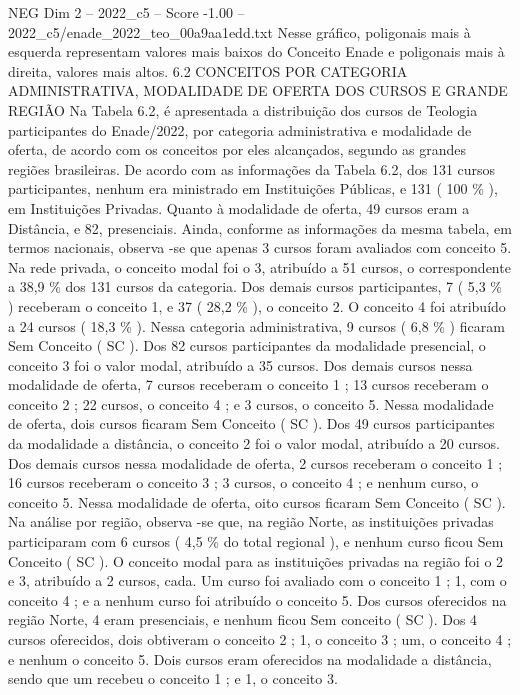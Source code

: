 \begin{textsample}{NEG Dim 2 – 2022\_c5 – Score -1.00 – 2022\_c5/enade\_2022\_teo\_00a9aa1edd.txt}
Nesse gráfico, poligonais mais à esquerda representam valores mais baixos do Conceito Enade e poligonais mais à direita, valores mais altos. 6.2 CONCEITOS POR CATEGORIA ADMINISTRATIVA, MODALIDADE DE OFERTA DOS CURSOS E GRANDE REGIÃO Na Tabela 6.2, é apresentada a distribuição dos cursos de Teologia participantes do Enade/2022, por categoria administrativa e modalidade de oferta, de acordo com os conceitos por eles alcançados, segundo as grandes regiões brasileiras.
De acordo com as informações da Tabela 6.2, dos 131 cursos participantes, nenhum era ministrado em Instituições Públicas, e 131 ( 100 \% ), em Instituições Privadas.
Quanto à modalidade de oferta, 49 cursos eram a Distância, e 82, presenciais.
Ainda, conforme as informações da mesma tabela, em termos nacionais, observa -se que apenas 3 cursos foram avaliados com conceito 5.
Na rede privada, o conceito modal foi o 3, atribuído a 51 cursos, o correspondente a 38,9 \% dos 131 cursos da categoria.
Dos demais cursos participantes, 7 ( 5,3 \% ) receberam o conceito 1, e 37 ( 28,2 \% ), o conceito 2.
O conceito 4 foi atribuído a 24 cursos ( 18,3 \% ).
Nessa categoria administrativa, 9 cursos ( 6,8 \% ) ficaram Sem Conceito ( SC ).
Dos 82 cursos participantes da modalidade presencial, o conceito 3 foi o valor modal, atribuído a 35 cursos.
Dos demais cursos nessa modalidade de oferta, 7 cursos receberam o conceito 1 ; 13 cursos receberam o conceito 2 ; 22 cursos, o conceito 4 ; e 3 cursos, o conceito 5.
Nessa modalidade de oferta, dois cursos ficaram Sem Conceito ( SC ).
Dos 49 cursos participantes da modalidade a distância, o conceito 2 foi o valor modal, atribuído a 20 cursos.
Dos demais cursos nessa modalidade de oferta, 2 cursos receberam o conceito 1 ; 16 cursos receberam o conceito 3 ; 3 cursos, o conceito 4 ; e nenhum curso, o conceito 5.
Nessa modalidade de oferta, oito cursos ficaram Sem Conceito ( SC ).
Na análise por região, observa -se que, na região Norte, as instituições privadas participaram com 6 cursos ( 4,5 \% do total regional ), e nenhum curso ficou Sem Conceito ( SC ).
O conceito modal para as instituições privadas na região foi o 2 e 3, atribuído a 2 cursos, cada.
Um curso foi avaliado com o conceito 1 ; 1, com o conceito 4 ; e a nenhum curso foi atribuído o conceito 5.
Dos cursos oferecidos na região Norte, 4 eram presenciais, e nenhum ficou Sem conceito ( SC ).
Dos 4 cursos oferecidos, dois obtiveram o conceito 2 ; 1, o conceito 3 ; um, o conceito 4 ; e nenhum o conceito 5.
Dois cursos eram oferecidos na modalidade a distância, sendo que um recebeu o conceito 1 ; e 1, o conceito 3.

\end{textsample}
